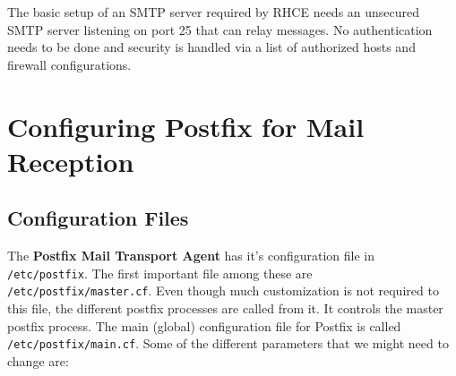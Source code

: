 The basic setup of an SMTP server required by RHCE needs an unsecured SMTP server listening on port 25 that can relay messages. No authentication needs to be done and security is handled via a list of authorized hosts and firewall configurations. 

	\section{Configuring Postfix for Mail Reception}
\subsection{Configuration Files}
\vspace{-10pt}
The \textbf{Postfix Mail Transport Agent} has it's configuration file in \verb|/etc/postfix|. The first important file among these are \verb|/etc/postfix/master.cf|. Even though much customization is not required to this file, the different postfix processes are called from it. It controls the master postfix process. The main (global) configuration file for Postfix is called \verb|/etc/postfix/main.cf|. Some of the different parameters that we might need to change are:

